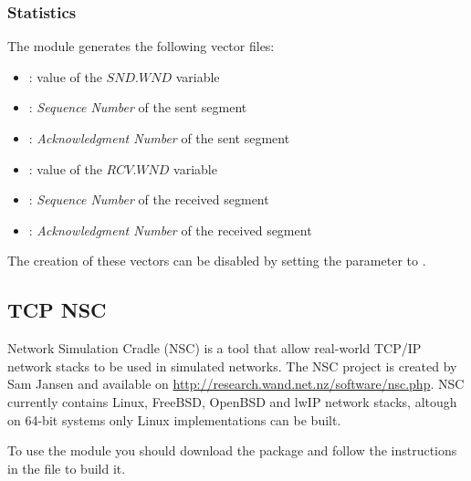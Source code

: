 
\subsubsection*{Statistics}

The  module generates the following vector files:

\begin{itemize}
  \item {}: value of the $SND.WND$ variable
  \item {}: \emph{Sequence Number} of the sent segment
  \item {}: \emph{Acknowledgment Number } of the sent segment
  \item {}: value of the $RCV.WND$ variable
  \item {}: \emph{Sequence Number} of the received segment
  \item {}: \emph{Acknowledgment Number} of the received segment
\end{itemize}

The creation of these vectors can be disabled by setting the 
parameter to .


\subsection{TCP NSC}

Network Simulation Cradle (NSC) is a tool that allow real-world TCP/IP network stacks
to be used in simulated networks. The NSC project is created by Sam Jansen
and available on \url{http://research.wand.net.nz/software/nsc.php}. NSC currently
contains Linux, FreeBSD, OpenBSD and lwIP network stacks, altough on 64-bit
systems only Linux implementations can be built.

To use the  module you should download the 
 package and follow the instructions
in the  file to build it.

